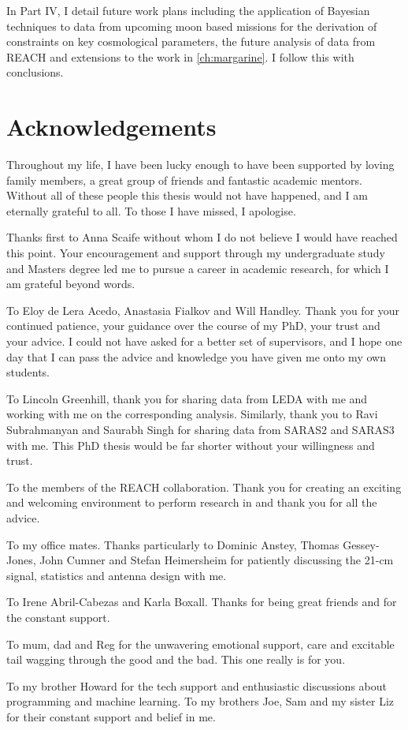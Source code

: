 \documentclass[a4paper,11pt,twoside,extrafontsizes,oldfontcommands]{memoir}
\newcommand{\mysection}[1]{%
    \section*{#1}%
    \addcontentsline{toc}{section}{#1}%
    \markright{#1}%
}
\begin{document}
In Part IV, I detail future work plans including the application of Bayesian techniques to data from upcoming moon based missions for the derivation of constraints on key cosmological parameters, the future analysis of data from REACH and extensions to the work in \cref{ch:margarine}. I follow this with conclusions. 

\mysection{Acknowledgements}

Throughout my life, I have been lucky enough to have been supported by loving family members, a great group of friends and fantastic academic mentors. Without all of these people this thesis would not have happened, and I am eternally grateful to all. To those I have missed, I apologise.

Thanks first to Anna Scaife without whom I do not believe I would have reached this point. Your encouragement and support through my undergraduate study and Masters degree led me to pursue a career in academic research, for which I am grateful beyond words.

To Eloy de Lera Acedo, Anastasia Fialkov and Will Handley. Thank you for your continued patience, your guidance over the course of my PhD, your trust and your advice. I could not have asked for a better set of supervisors, and I hope one day that I can pass the advice and knowledge you have given me onto my own students.

To Lincoln Greenhill, thank you for sharing data from LEDA with me and working with me on the corresponding analysis. Similarly, thank you to Ravi Subrahmanyan and Saurabh Singh for sharing data from SARAS2 and SARAS3 with me. This PhD thesis would be far shorter without your willingness and trust.

To the members of the REACH collaboration. Thank you for creating an exciting and welcoming environment to perform research in and thank you for all the advice.

To my office mates. Thanks particularly to Dominic Anstey, Thomas Gessey-Jones, John Cumner and Stefan Heimersheim for patiently discussing the 21-cm signal, statistics and antenna design with me.

To Irene Abril-Cabezas and Karla Boxall. Thanks for being great friends and for the constant support.

To mum, dad and Reg for the unwavering emotional support, care and excitable tail wagging through the good and the bad. This one really is for you.

To my brother Howard for the tech support and enthusiastic discussions about programming and machine learning. To my brothers Joe, Sam and my sister Liz for their constant support and belief in me.
\end{document}
